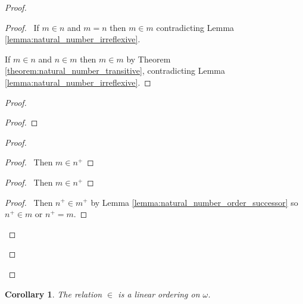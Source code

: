 \documentclass{report}
\let\qed\relax
\newtheorem{corollary}{Corollary}[axiom]
\theoremstyle{definition}
\begin{document}
    \begin{proof}
        \pf
        \begin{proof}
            \pf\ If $m \in n$ and $m = n$ then $m \in m$ contradicting Lemma \ref{lemma:natural_number_irreflexive}.

            If $m \in n$ and $n \in m$ then $m \in m$ by Theorem \ref{theorem:natural_number_transitive},
            contradicting Lemma \ref{lemma:natural_number_irreflexive}.
        \end{proof}
        \begin{proof}
            \begin{proof}
            \end{proof}
            \begin{proof}
                \begin{proof}
                    \pf\ Then $m \in n^+$
                \end{proof}
                \begin{proof}
                    \pf\ Then $m \in n^+$
                \end{proof}
                \begin{proof}
                    \pf\ Then $n^+ \in m^+$ by Lemma \ref{lemma:natural_number_order_successor}
                    so $n^+ \in m$ or $n^+ = m$.
                \end{proof}
            \end{proof}
        \end{proof}
        \qed
    \end{proof}

    \begin{corollary}
        The relation $\in$ is a linear ordering on $\omega$.    
    \end{corollary}
\end{document}
